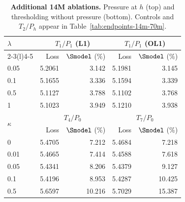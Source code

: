 \begin{table}[!htbp]
\centering\small
\setlength{\tabcolsep}{6pt}
\renewcommand{\arraystretch}{1.05}
\caption{\textbf{Additional 14M ablations.} Pressure at $h$ (top) and thresholding without pressure (bottom). Controls and $T_2/P_h$ appear in Table~\ref{tab:endpoints-14m-70m}.}
\label{tab:endpoints-14m-only}
\begin{tabular}{@{}lrrrr@{}}
\toprule
\multirow{2}{*}{$\lambda$} & \multicolumn{2}{c}{$T_1/P_1$ (L1)} & \multicolumn{2}{c}{$T_1/P_1$ (OL1)} \\
\cmidrule(lr){2-3}\cmidrule(l){4-5}
 & Loss & $\Smodel$ (\%) & Loss & $\Smodel$ (\%) \\
\midrule
0.05 & 5.2061 & 3.142 & 5.1981 & 3.145 \\
0.1 & 5.1655 & 3.336 & 5.1594 & 3.339 \\
0.5 & 5.1127 & 3.788 & 5.1102 & 3.768 \\
1 & 5.1023 & 3.949 & 5.1210 & 3.938 \\
\midrule
\multirow{2}{*}{$\kappa$} & \multicolumn{2}{c}{$T_4/P_0$} & \multicolumn{2}{c}{$T_7/P_0$} \\
\cmidrule(lr){2-3}\cmidrule(l){4-5}
 & Loss & $\Smodel$ (\%) & Loss & $\Smodel$ (\%) \\
\midrule
0 & 5.4705 & 7.212 & 5.4684 & 7.218 \\
0.01 & 5.4665 & 7.414 & 5.4588 & 7.618 \\
0.05 & 5.4341 & 8.206 & 5.4379 & 9.127 \\
0.1 & 5.4196 & 8.953 & 5.4287 & 10.425 \\
0.5 & 5.6597 & 10.216 & 5.7029 & 15.387 \\
\bottomrule
\end{tabular}
\end{table}
